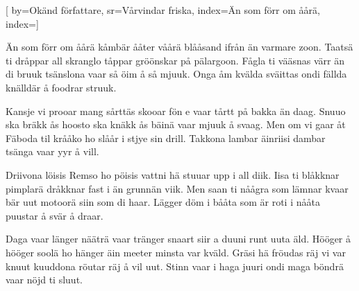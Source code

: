 

[ 		%
	by={Okänd författare},					%
	sr={Vårvindar friska},					%
	index={Än som förr om åårä}, 						%
	index={}]						%
	

\beginverse*						%
Än som förr om åårä
kåmbär ååter våårä
blååsand ifrån än varmare zoon.
Taatsä ti dråppar
all skranglo tåppar
gröönskar på pälargoon.
Fågla ti vääsnas värr än di bruuk
tsänslona vaar så öim å så mjuuk.
Onga åm kvälda
sväittas ondi fällda
knälldär å foodrar struuk.
\endverse							%

\beginverse*						%
Kansje vi prooar
mang sårttäs skooar
fön e vaar tårtt på bakka än daag.
Snuuo ska bräkk ås
hoosto ska knäkk ås
bäinä vaar mjuuk å svaag.
Men om vi gaar åt Fäboda til
krååko ho slåår i stjye sin drill.
Takkona lambar
äinriisi dambar
tsänga vaar yyr å vill.
\endverse							%

\beginverse*						%
Driivona löisis
Remso ho pöisis
vattni hä stuuar upp i all diik.
Iisa ti blåkknar
pimplarä dråkknar
fast i än grunnän viik.
Men saan ti nåågra som lämnar kvaar
bär uut motoorä siin som di haar.
Lägger döm i bååta
som är roti i nååta
puustar å svär å draar.
\endverse							%

\beginverse*						%
Daga vaar länger
nääträ vaar tränger
snaart siir a duuni runt uuta äld.
Hööger å hööger
soolä ho hänger
äin meeter minsta var kväld.
Gräsi hä fröudas räj vi var knuut
kuuddona röutar räj å vil uut.
Stinn vaar i haga
juuri ondi maga
böndrä vaar nöjd ti sluut.
\endverse

\endsong							%

